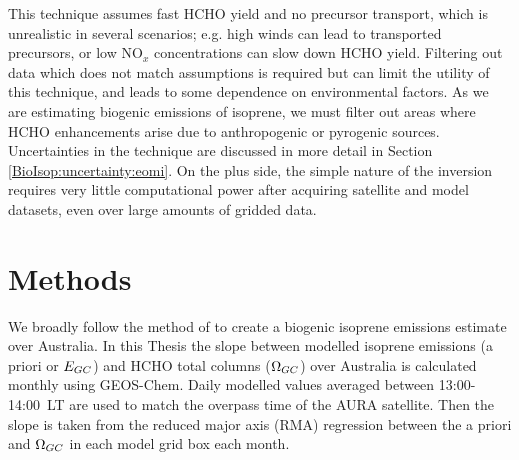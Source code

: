       This technique assumes fast HCHO yield and no precursor transport, which is unrealistic in several scenarios; e.g. high winds can lead to transported precursors, or low NO$_x$ concentrations can slow down HCHO yield.
      Filtering out data which does not match assumptions is required but can limit the utility of this technique, and leads to some dependence on environmental factors.
      As we are estimating biogenic emissions of isoprene, we must filter out areas where HCHO enhancements arise due to anthropogenic or pyrogenic sources.
      Uncertainties in the technique are discussed in more detail in Section \ref{BioIsop:uncertainty:eomi}.
      On the plus side, the simple nature of the inversion requires very little computational power after acquiring satellite and model datasets, even over large amounts of gridded data.
      
\section{Methods}
  \label{BioIsop:method}
  
  
  We broadly follow the method of \textcite{Palmer2001} to create a biogenic isoprene emissions estimate over Australia.
  In this Thesis the slope between modelled isoprene emissions (a priori or $E_{GC}$) and HCHO total columns ($\Omega_{GC}$) over Australia is calculated monthly using GEOS-Chem.
  Daily modelled values averaged between 13:00-14:00~LT are used to match the overpass time of the AURA satellite.
  Then the slope is taken from the reduced major axis (RMA) regression between the a priori and $\Omega_{GC}$ in each model grid box each month.
  
  
  
  
